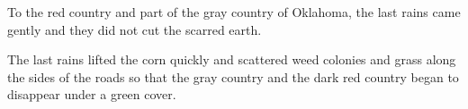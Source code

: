 \documentclass{article}
\begin{document}
\SetHorizontalCoffin{}

To the red country and part of the gray country of Oklahoma, the last rains came gently and they did not cut the scarred earth.

The last rains lifted the corn quickly and scattered weed colonies and grass along the sides of the roads so that the gray country and the dark red country began to disappear under a green cover.  
\end{document}
